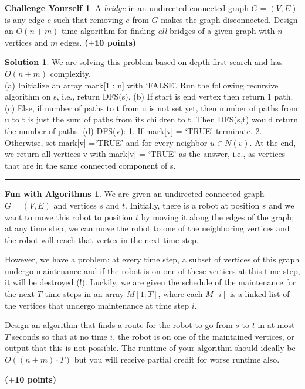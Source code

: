 \documentclass{article}
\theoremstyle{definition}
\newtheorem*{fun}{Fun with Algorithms}
\newtheorem*{challenge}{Challenge Yourself}
\def\fline{\rule{0.75\linewidth}{0.5pt}}
\newcommand{\finishline}{\begin{center}\fline\end{center}}
\newtheorem*{solution*}{Solution}
\newenvironment{solution}{\begin{solution*}}{{\finishline} \end{solution*}}
\newcommand{\grade}[1]{\hfill{\textbf{($\mathbf{#1}$ points)}}}
\begin{document}
\smallskip



\smallskip

\begin{challenge}
	A \emph{bridge} in an undirected connected graph $G=(V,E)$ is any edge $e$ such that removing $e$ from $G$ makes the graph disconnected. Design an $O(n+m)$ time algorithm
	 for finding \emph{all} bridges of a given graph with $n$ vertices and $m$ edges. \grade{+10}
\end{challenge}

\begin{solution}

We are solving this problem based on depth first search and has $O(n+m)$ complexity. \\

(a) Initialize an array mark[1 : n] with ‘FALSE’. Run the following recursive algorithm on s, i.e., return DFS(s). (b) If start is end vertex then return 1 path. (c) Else, if number of paths to t from u is not set yet, then number of paths from u to t is just the sum of paths from its children to t. Then DFS(s,t) would return the number of paths. (d) DFS(v): 1. If mark[v] = ‘TRUE’ terminate. 2. Otherwise, set mark[v] =‘TRUE’ and for every neighbor $u \in N(v)$.
At the end, we return all vertices v with mark[v] = ‘TRUE’ as the answer, i.e., as vertices that are in the same connected component of s. \\

\end{solution}

\smallskip

\begin{fun}
	 We are given an undirected connected graph $G=(V,E)$ and  vertices $s$ and $t$. Initially, there is a robot at position  $s$ and we want to move this robot to position $t$ by moving it along the edges of the graph; at any time step, 
	 we can move the robot to one of the  neighboring vertices and the robot will reach that vertex in the next time step. 
	 
	 However, we have a problem: at every time step, a subset of vertices of this graph undergo  maintenance and if the robot is on one of these vertices at this time step, 
	 it will be destroyed (!). Luckily, we are given the schedule of the maintenance for the next $T$ time steps in an array $M[1:T]$, where each $M[i]$ is a linked-list of the vertices that undergo maintenance at time step $i$.  
	 
	 Design an
	 algorithm that finds a route for the robot to go from $s$ to $t$ in at most $T$ seconds so that at no time $i$, the robot is on one of the maintained vertices, or output that this is not possible. The runtime of your algorithm should ideally be $O((n+m) \cdot T)$ 
	 but you will receive partial credit for worse runtime also.  
	 
\grade{+10}
	 
\end{fun}
\end{document}
